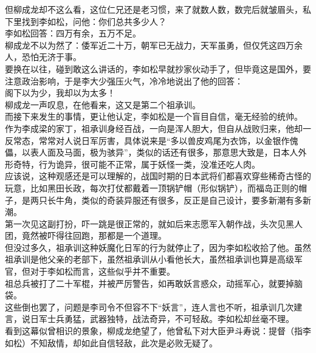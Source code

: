 \begin{multicols}{\theparacolNo}
但柳成龙却不这么看，这位仁兄还是老习惯，来了就数人数，数完后就皱眉头，私下里找到李如松，问他：你们总共多少人？\\

李如松回答：四万有余，五万不足。\\

柳成龙不以为然了：倭军近二十万，朝军已无战力，天军虽勇，但仅凭这四万余人，恐怕无济于事。\\

要换在以往，碰到敢这么讲话的，李如松早就抄家伙动手了，但毕竟这是国外，要注意政治影响，于是李大少强压火气，冷冷地说出了他的回答：\\

阁下以为少，我却以为太多！\\

柳成龙一声叹息，在他看来，这又是第二个祖承训。\\

而接下来发生的事情，更让他认定，李如松是一个盲目自信，毫无经验的统帅。\\

作为李成梁的家丁，祖承训身经百战，一向是浑人胆大，但自从战败归来，他却一反常态，常常对人说日军厉害，具体说来是“多以兽皮鸡尾为衣饰，以金银作傀儡，以表人面及马面，极为骇异”，类似的话还有很多，那意思大致是，日本人外形奇特，行为诡异，很可能不正常，属于妖怪一类，没准还吃人肉。\\

应该说，这种观感还是可以理解的，战国时期的日本武将们都喜欢穿些稀奇古怪的玩意，比如黑田长政，每次打仗都戴着一顶锅铲帽（形似锅铲），而福岛正则的帽子，是两只长牛角，类似的奇装异服还有很多，反正是自己设计，要多新潮有多新潮。\\

第一次见这副打扮，吓一跳是很正常的，就如后来志愿军入朝作战，头次见黑人团，竟然被吓得往回跑，那都是一个道理。\\

但没过多久，祖承训这种妖魔化日军的行为就停止了，因为李如松收拾了他。虽然祖承训是他父亲的老部下，虽然祖承训从小看他长大，虽然祖承训也算是高级军官，但对于李如松而言，这些似乎并不重要。\\

祖总兵被打了二十军棍，并被严厉警告，如再敢妖言惑众，动摇军心，就要掉脑袋。\\

这些倒也罢了，问题是李司令不但容不下“妖言”，连人言也不听，祖承训几次建言，说日军士兵勇猛，武器独特，战法奇异，不可轻敌。李如松却丝毫不理。\\

看到这幕似曾相识的景象，柳成龙绝望了，他曾私下对大臣尹斗寿说：提督（指李如松）不知敌情，却如此自信轻敌，此次是必败无疑了。\\


\end{multicols}
